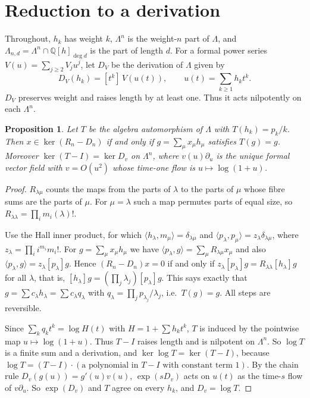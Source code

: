 \documentclass[11pt]{article}
\newtheorem{proposition}[theorem]{Proposition}
\theoremstyle{definition}
\theoremstyle{remark}
\newcommand{\Q}{\mathbb{Q}}
\newcommand{\La}{\Lambda}
\begin{document}
\section{Reduction to a derivation}\label{sec:reduction}

Throughout, $h_k$ has weight $k$, $\La^n$ is the weight-$n$ part of $\La$, and $\La_{n,d}=\La^n\cap\Q[h]_{\deg d}$
is the part of length $d$. For a formal power series $V(u)=\sum_{j\ge2}V_ju^j$, let $D_V$ be the derivation of
$\La$ given by
\[
  D_V(h_k)=[t^k]\,V(u(t)),\qquad u(t)=\sum_{k\ge1}h_kt^k .
\]
$D_V$ preserves weight and raises length by at least one. Thus it acts nilpotently on each $\La^n$.

\begin{proposition}\label{R1}
Let $T$ be the algebra automorphism of $\La$ with $T(h_k)=p_k/k$. Then $x\in\ker(R_n-D_n)$ if and only if
$g=\sum_\mu x_\mu h_\mu$ satisfies $T(g)=g$. Moreover $\ker(T-I)=\ker D_v$ on $\La^n$, where $v(u)\partial_u$
is the unique formal vector field with $v=O(u^2)$ whose time-one flow is $u\mapsto\log(1+u)$.
\end{proposition}

\begin{proof}
$R_{\lambda\mu}$ counts the maps from the parts of $\lambda$ to the parts of $\mu$ whose fibre sums are the parts of
$\mu$. For $\mu=\lambda$ such a map permutes parts of equal size, so $R_{\lambda\lambda}=\prod_im_i(\lambda)!$.

Use the Hall inner product, for which $\langle h_\lambda,m_\mu\rangle=\delta_{\lambda\mu}$ and
$\langle p_\lambda,p_\mu\rangle=z_\lambda\delta_{\lambda\mu}$, where $z_\lambda=\prod_ii^{m_i}m_i!$. For
$g=\sum_\mu x_\mu h_\mu$ we have $\langle p_\lambda,g\rangle=\sum_\mu R_{\lambda\mu}x_\mu$ and also
$\langle p_\lambda,g\rangle=z_\lambda[p_\lambda]g$. Hence $(R_n-D_n)x=0$ if and only if
$z_\lambda[p_\lambda]g=R_{\lambda\lambda}[h_\lambda]g$ for all $\lambda$, that is,
$[h_\lambda]g=(\prod_j\lambda_j)[p_\lambda]g$. This says exactly that $g=\sum c_\lambda h_\lambda=\sum c_\lambda
q_\lambda$ with $q_\lambda=\prod_jp_{\lambda_j}/\lambda_j$, i.e.\ $T(g)=g$. All steps are reversible.

Since $\sum_kq_kt^k=\log H(t)$ with $H=1+\sum h_kt^k$, $T$ is induced by the pointwise map $u\mapsto\log(1+u)$.
Thus $T-I$ raises length and is nilpotent on $\La^n$. So $\log T$ is a finite sum and a derivation, and
$\ker\log T=\ker(T-I)$, because $\log T=(T-I)\cdot(\text{a polynomial in }T-I\text{ with constant term }1)$. By the
chain rule $D_v(g(u))=g'(u)v(u)$, $\exp(sD_v)$ acts on $u(t)$ as the time-$s$ flow of $v\partial_u$. So
$\exp(D_v)$ and $T$ agree on every $h_k$, and $D_v=\log T$.
\end{proof}
\end{document}
